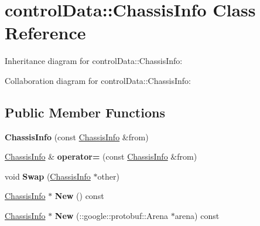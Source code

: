 \hypertarget{classcontrol_data_1_1_chassis_info}{}\section{control\+Data\+:\+:Chassis\+Info Class Reference}
\label{classcontrol_data_1_1_chassis_info}


Inheritance diagram for control\+Data\+:\+:Chassis\+Info\+:


Collaboration diagram for control\+Data\+:\+:Chassis\+Info\+:
\subsection*{Public Member Functions}
\begin{DoxyCompactItemize}
\item 
\mbox{\label{classcontrol_data_1_1_chassis_info_abc40b56f6fffbbe11028788ee4c3676c}} 
{\bfseries Chassis\+Info} (const \hyperlink{classcontrol_data_1_1_chassis_info}{Chassis\+Info} \&from)
\item 
\mbox{\label{classcontrol_data_1_1_chassis_info_af6b5b63483daa80cba1c30967378e997}} 
\hyperlink{classcontrol_data_1_1_chassis_info}{Chassis\+Info} \& {\bfseries operator=} (const \hyperlink{classcontrol_data_1_1_chassis_info}{Chassis\+Info} \&from)
\item 
\mbox{\label{classcontrol_data_1_1_chassis_info_af378895be013599ca274f7dc0d399abc}} 
void {\bfseries Swap} (\hyperlink{classcontrol_data_1_1_chassis_info}{Chassis\+Info} $\ast$other)
\item 
\mbox{\label{classcontrol_data_1_1_chassis_info_a021c392efc440ce5a7d4610e0006cbef}} 
\hyperlink{classcontrol_data_1_1_chassis_info}{Chassis\+Info} $\ast$ {\bfseries New} () const
\item 
\mbox{\label{classcontrol_data_1_1_chassis_info_a020a8a70abf9915ee1710d643ca926df}} 
\hyperlink{classcontrol_data_1_1_chassis_info}{Chassis\+Info} $\ast$ {\bfseries New} (\+::google\+::protobuf\+::\+Arena $\ast$arena) const
\item 
\mbox{\label{classcontrol_data_1_1_chassis_info_aa006f9820f01cf1cae8dd74bc08a3ffa}} 

\end{DoxyCompactItemize}
